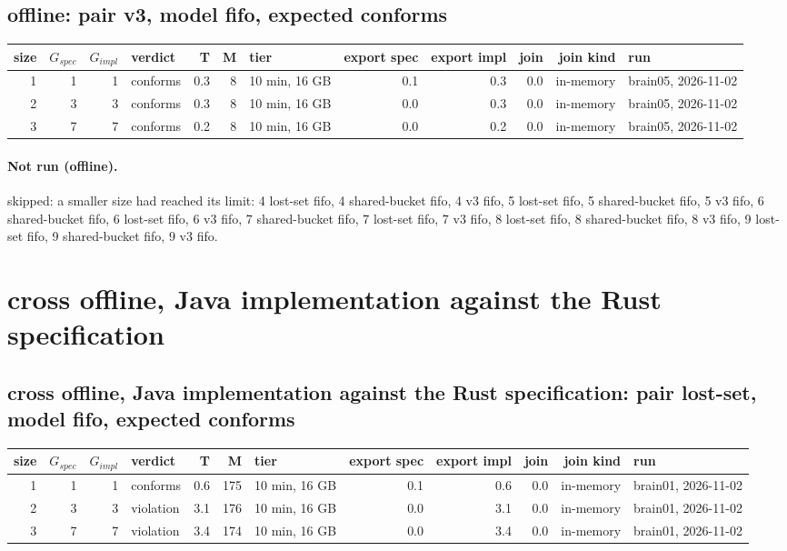 \documentclass[10pt]{article}
\begin{document}
\subsection*{offline: pair \textsf{v3}, model fifo, expected conforms}
\begin{longtable}{@{}rrrlrrlrrrrl@{}}
\toprule
size & $G_{\mathit{spec}}$ & $G_{\mathit{impl}}$ & verdict & T & M & tier & export spec & export impl & join & join kind & run \\
\midrule
\endhead
\color{red} 1 & 1 & 1 & conforms & 0.3 & 8 & 10 min, 16 GB & 0.1 & 0.3 & 0.0 & in-memory & brain05, 2026-11-02 \\
\color{red} 2 & 3 & 3 & conforms & 0.3 & 8 & 10 min, 16 GB & 0.0 & 0.3 & 0.0 & in-memory & brain05, 2026-11-02 \\
\color{red} 3 & 7 & 7 & conforms & 0.2 & 8 & 10 min, 16 GB & 0.0 & 0.2 & 0.0 & in-memory & brain05, 2026-11-02 \\
\bottomrule
\end{longtable}
\paragraph{Not run (offline).}
skipped: a smaller size had reached its limit: 4 lost-set fifo, 4 shared-bucket fifo, 4 v3 fifo, 5 lost-set fifo, 5 shared-bucket fifo, 5 v3 fifo, 6 shared-bucket fifo, 6 lost-set fifo, 6 v3 fifo, 7 shared-bucket fifo, 7 lost-set fifo, 7 v3 fifo, 8 lost-set fifo, 8 shared-bucket fifo, 8 v3 fifo, 9 lost-set fifo, 9 shared-bucket fifo, 9 v3 fifo.\par
\section*{cross offline, Java implementation against the Rust specification}
\subsection*{cross offline, Java implementation against the Rust specification: pair \textsf{lost-set}, model fifo, expected conforms}
\begin{longtable}{@{}rrrlrrlrrrrl@{}}
\toprule
size & $G_{\mathit{spec}}$ & $G_{\mathit{impl}}$ & verdict & T & M & tier & export spec & export impl & join & join kind & run \\
\midrule
\endhead
\color{red} 1 & 1 & 1 & conforms & 0.6 & 175 & 10 min, 16 GB & 0.1 & 0.6 & 0.0 & in-memory & brain01, 2026-11-02 \\
\color{red} 2 & 3 & 3 & violation & 3.1 & 176 & 10 min, 16 GB & 0.0 & 3.1 & 0.0 & in-memory & brain01, 2026-11-02 \\
\color{red} 3 & 7 & 7 & violation & 3.4 & 174 & 10 min, 16 GB & 0.0 & 3.4 & 0.0 & in-memory & brain01, 2026-11-02 \\
\bottomrule
\end{longtable}
\end{document}

